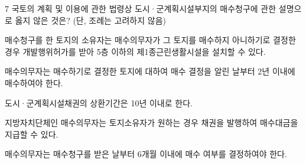 \begin{question}{7}
국토의 계획 및 이용에 관한 법령상 도시·군계획시설부지의 매수청구에 관한 설명으로 옳지 않은 것은? (단, 조례는 고려하지 않음)
\begin{choices}
  \item 매수청구를 한 토지의 소유자는 매수의무자가 그 토지를 매수하지 아니하기로 결정한 경우 개발행위허가를 받아 5층 이하의 제1종근린생활시설을 설치할 수 있다.
  \item 매수의무자는 매수하기로 결정한 토지에 대하여 매수 결정을 알린 날부터 2년 이내에 매수하여야 한다.
  \item 도시·군계획시설채권의 상환기간은 10년 이내로 한다.
  \item 지방자치단체인 매수의무자는 토지소유자가 원하는 경우 채권을 발행하여 매수대금을 지급할 수 있다.
  \item 매수의무자는 매수청구를 받은 날부터 6개월 이내에 매수 여부를 결정하여야 한다.
\end{choices}
\end{question}
